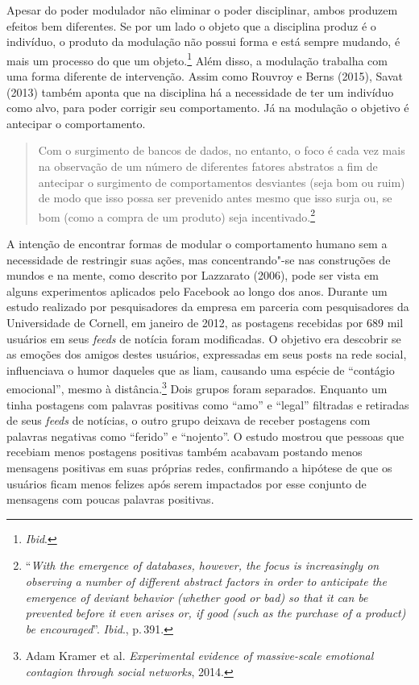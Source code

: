 Apesar do poder modulador não eliminar o poder disciplinar, ambos
produzem efeitos bem diferentes. Se por um lado o objeto que a
disciplina produz é o indivíduo, o produto da modulação não possui forma
e está sempre mudando, é mais um processo do que um objeto.\footnote{\textit{Ibid}.}
Além disso, a modulação trabalha com uma forma diferente de
intervenção. Assim como Rouvroy e Berns (2015), Savat (2013) também
aponta que na disciplina há a necessidade de ter um indivíduo como alvo,
para poder corrigir seu comportamento. Já na modulação o objetivo é
antecipar o comportamento.

\begin{quote}
Com o surgimento de bancos de dados, no entanto, o foco é cada vez mais
na observação de um número de diferentes fatores abstratos a fim de
antecipar o surgimento de comportamentos desviantes (seja bom ou ruim)
de modo que isso possa ser prevenido antes mesmo que isso surja ou, se
bom (como a compra de um produto) seja incentivado.\footnote{``\textit{With the
  emergence of databases, however, the focus is increasingly on
  observing a number of different abstract factors in order to
  anticipate the emergence of deviant behavior (whether good or bad) so
  that it can be prevented before it even arises or, if good (such as
  the purchase of a product) be encouraged}''. \textit{Ibid}., p.\,391.}
\end{quote}

A intenção de encontrar formas de modular o comportamento humano sem a
necessidade de restringir suas ações, mas concentrando"-se nas
construções de mundos e na mente, como descrito por Lazzarato (2006),
pode ser vista em alguns experimentos aplicados pelo Facebook ao longo
dos anos. Durante um estudo realizado por pesquisadores da empresa em
parceria com pesquisadores da Universidade de Cornell, em janeiro de
2012, as postagens recebidas por 689 mil usuários em seus \textit{feeds} de notícia
foram modificadas. O objetivo era descobrir se as emoções dos amigos
destes usuários, expressadas em seus posts na rede social, influenciava
o humor daqueles que as liam, causando uma espécie de ``contágio
emocional'', mesmo à distância.\footnote{Adam Kramer et al. \textit{Experimental evidence of massive-scale emotional contagion through social networks}, 2014.} Dois
grupos foram separados. Enquanto um tinha postagens com palavras
positivas como ``amo'' e ``legal'' filtradas e retiradas de seus \textit{feeds}
de notícias, o outro grupo deixava de receber postagens com palavras negativas
como ``ferido'' e ``nojento''. O estudo mostrou que pessoas que recebiam
menos postagens positivas também acabavam postando menos mensagens
positivas em suas próprias redes, confirmando a hipótese de que os
usuários ficam menos felizes após serem impactados por esse conjunto de
mensagens com poucas palavras positivas.

